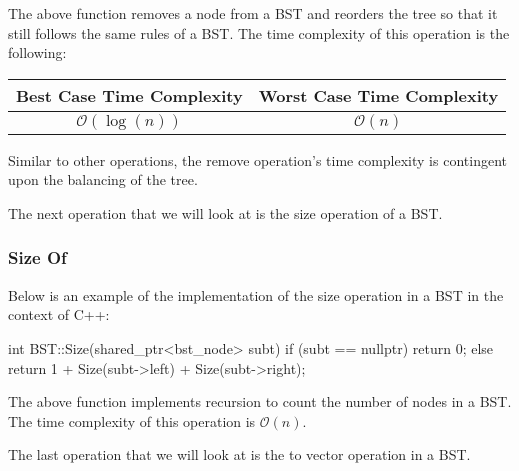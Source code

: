 \begin{highlight}
The above function removes a node from a BST and reorders the tree so that it still follows the same rules of a BST. The time complexity of this operation is the following: \newline

\begin{center}
    \begin{tabular}[ht]{|c|c|}
        \hline \textbf{Best Case Time Complexity} & \textbf{Worst Case Time Complexity} \\ \hline
        $\mathcal{O}(\log{(n)})$ & $\mathcal{O}(n)$ \\ \hline
    \end{tabular}
\end{center}

\noindent Similar to other operations, the remove operation's time complexity is contingent upon the balancing of the tree.

\end{highlight}

The next operation that we will look at is the size operation of a BST.

\begin{highlight}

\subsubsection*{Size Of}

Below is an example of the implementation of the size operation in a BST in the context of C++:

\begin{code}
int BST::Size(shared_ptr<bst_node> subt){
    if (subt == nullptr) {
        return 0;
    }
    else {
        return 1 + Size(subt->left) + Size(subt->right);
    }
}
\end{code}

\noindent The above function implements recursion to count the number of nodes in a BST. The time complexity of this operation is $\mathcal{O}(n)$.

\end{highlight}

The last operation that we will look at is the to vector operation in a BST.

